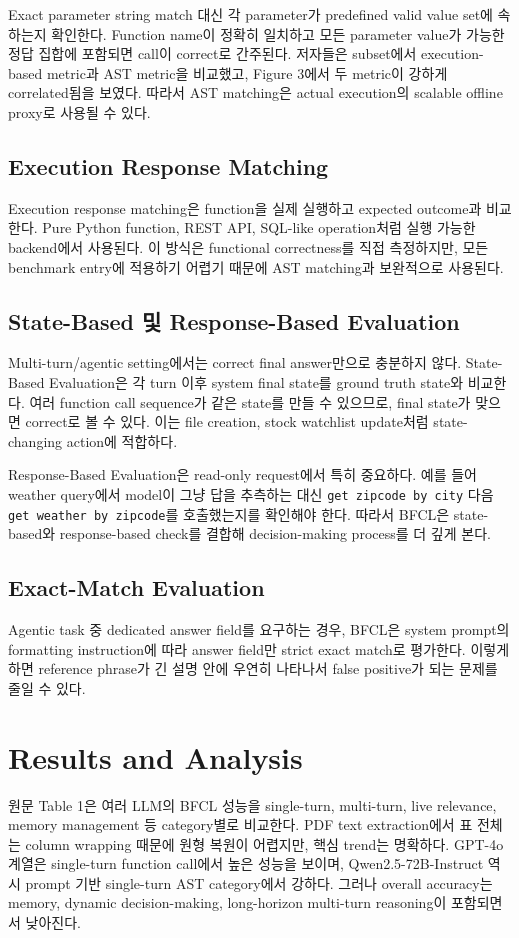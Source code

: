 \documentclass[11pt]{article}
\begin{document}
Exact parameter string match 대신 각 parameter가 predefined valid value set에 속하는지 확인한다. Function name이 정확히 일치하고 모든 parameter value가 가능한 정답 집합에 포함되면 call이 correct로 간주된다. 저자들은 subset에서 execution-based metric과 AST metric을 비교했고, Figure 3에서 두 metric이 강하게 correlated됨을 보였다. 따라서 AST matching은 actual execution의 scalable offline proxy로 사용될 수 있다.

\subsection{Execution Response Matching}
Execution response matching은 function을 실제 실행하고 expected outcome과 비교한다. Pure Python function, REST API, SQL-like operation처럼 실행 가능한 backend에서 사용된다. 이 방식은 functional correctness를 직접 측정하지만, 모든 benchmark entry에 적용하기 어렵기 때문에 AST matching과 보완적으로 사용된다.

\subsection{State-Based 및 Response-Based Evaluation}
Multi-turn/agentic setting에서는 correct final answer만으로 충분하지 않다. State-Based Evaluation은 각 turn 이후 system final state를 ground truth state와 비교한다. 여러 function call sequence가 같은 state를 만들 수 있으므로, final state가 맞으면 correct로 볼 수 있다. 이는 file creation, stock watchlist update처럼 state-changing action에 적합하다.

Response-Based Evaluation은 read-only request에서 특히 중요하다. 예를 들어 weather query에서 model이 그냥 답을 추측하는 대신 \texttt{get zipcode by city} 다음 \texttt{get weather by zipcode}를 호출했는지를 확인해야 한다. 따라서 BFCL은 state-based와 response-based check를 결합해 decision-making process를 더 깊게 본다.

\subsection{Exact-Match Evaluation}
Agentic task 중 dedicated answer field를 요구하는 경우, BFCL은 system prompt의 formatting instruction에 따라 answer field만 strict exact match로 평가한다. 이렇게 하면 reference phrase가 긴 설명 안에 우연히 나타나서 false positive가 되는 문제를 줄일 수 있다.

\section{Results and Analysis}
원문 Table 1은 여러 LLM의 BFCL 성능을 single-turn, multi-turn, live relevance, memory management 등 category별로 비교한다. PDF text extraction에서 표 전체는 column wrapping 때문에 원형 복원이 어렵지만, 핵심 trend는 명확하다. GPT-4o 계열은 single-turn function call에서 높은 성능을 보이며, Qwen2.5-72B-Instruct 역시 prompt 기반 single-turn AST category에서 강하다. 그러나 overall accuracy는 memory, dynamic decision-making, long-horizon multi-turn reasoning이 포함되면서 낮아진다.
\end{document}
